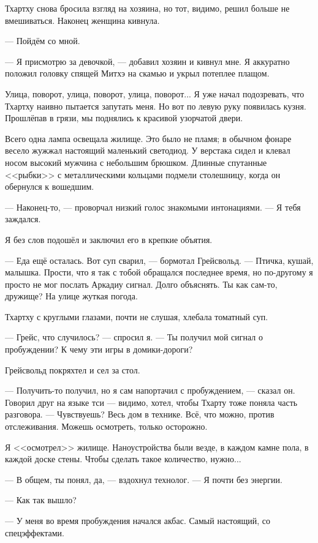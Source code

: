 Тхартху снова бросила взгляд на хозяина, но тот, видимо, решил больше не вмешиваться.
Наконец женщина кивнула.

--- Пойдём со мной.

--- Я присмотрю за девочкой, --- добавил хозяин и кивнул мне.
Я аккуратно положил головку спящей Митхэ на скамью и укрыл потеплее плащом.

Улица, поворот, улица, поворот, улица, поворот...
Я уже начал подозревать, что Тхартху наивно пытается запутать меня.
Но вот по левую руку появилась кузня.
Прошлёпав в грязи, мы поднялись к красивой узорчатой двери.

Всего одна лампа освещала жилище.
Это было не пламя;
в обычном фонаре весело жужжал настоящий маленький светодиод.
У верстака сидел и клевал носом высокий мужчина с небольшим брюшком.
Длинные спутанные <<рыбки>> с металлическими кольцами подмели столешницу, когда он обернулся к вошедшим.

--- Наконец-то, --- проворчал низкий голос знакомыми интонациями.
--- Я тебя заждался.

Я без слов подошёл и заключил его в крепкие объятия.

\asterism

--- Еда ещё осталась.
Вот суп сварил, --- бормотал Грейсвольд.
--- Птичка, кушай, малышка.
Прости, что я так с тобой обращался последнее время, но по-другому я просто не мог послать Аркадиу сигнал.
Долго объяснять.
Ты как сам-то, дружище?
На улице жуткая погода.

Тхартху с круглыми глазами, почти не слушая, хлебала томатный суп.

--- Грейс, что случилось? --- спросил я.
--- Ты получил мой сигнал о пробуждении?
К чему эти игры в домики-дороги?

Грейсвольд покряхтел и сел за стол.

--- Получить-то получил, но я сам напортачил с пробуждением, --- сказал он.
Говорил друг на языке тси --- видимо, хотел, чтобы Тхарту тоже поняла часть разговора.
--- Чувствуешь?
Весь дом в технике.
Всё, что можно, против отслеживания.
Можешь осмотреть, только осторожно.

Я <<осмотрел>> жилище.
Наноустройства были везде, в каждом камне пола, в каждой доске стены.
Чтобы сделать такое количество, нужно...

--- В общем, ты понял, да, --- вздохнул технолог.
--- Я почти без энергии.

--- Как так вышло?

--- У меня во время пробуждения начался акбас.
Самый настоящий, со спецэффектами.

